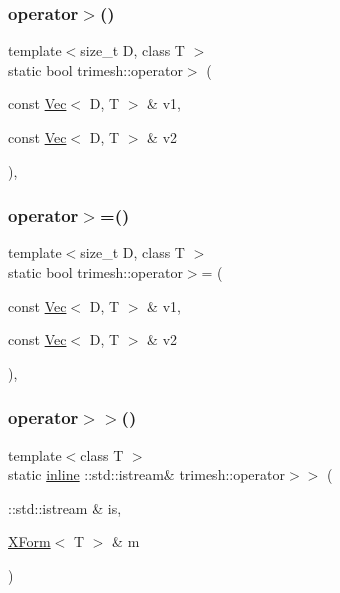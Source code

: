\subsubsection{\texorpdfstring{operator$>$()}{operator>()}}
{\footnotesize\ttfamily template$<$size\+\_\+t D, class T $>$ \\
static bool trimesh\+::operator$>$ (\begin{DoxyParamCaption}\item[{const \hyperlink{classtrimesh_1_1Vec}{Vec}$<$ D, T $>$ \&}]{v1,  }\item[{const \hyperlink{classtrimesh_1_1Vec}{Vec}$<$ D, T $>$ \&}]{v2 }\end{DoxyParamCaption})\hspace{0.3cm}{\ttfamily [inline]}, {\ttfamily [static]}}

\mbox{\label{namespacetrimesh_ae1cbc1884d934c33b1e66dcb38bfb08f}} 
\subsubsection{\texorpdfstring{operator$>$=()}{operator>=()}}
{\footnotesize\ttfamily template$<$size\+\_\+t D, class T $>$ \\
static bool trimesh\+::operator$>$= (\begin{DoxyParamCaption}\item[{const \hyperlink{classtrimesh_1_1Vec}{Vec}$<$ D, T $>$ \&}]{v1,  }\item[{const \hyperlink{classtrimesh_1_1Vec}{Vec}$<$ D, T $>$ \&}]{v2 }\end{DoxyParamCaption})\hspace{0.3cm}{\ttfamily [inline]}, {\ttfamily [static]}}

\mbox{\label{namespacetrimesh_af30b096ef8c05b3a4024670f52fa42e2}} 
\subsubsection{\texorpdfstring{operator$>$$>$()}{operator>>()}\hspace{0.1cm}{\footnotesize\ttfamily [1/2]}}
{\footnotesize\ttfamily template$<$class T $>$ \\
static \hyperlink{XForm_8h_a00d24c7231be28dbaf71f5408f30e44c}{inline} \+::std\+::istream\& trimesh\+::operator$>$$>$ (\begin{DoxyParamCaption}\item[{\+::std\+::istream \&}]{is,  }\item[{\hyperlink{classtrimesh_1_1XForm}{X\+Form}$<$ T $>$ \&}]{m }\end{DoxyParamCaption})\hspace{0.3cm}{\ttfamily [static]}}

